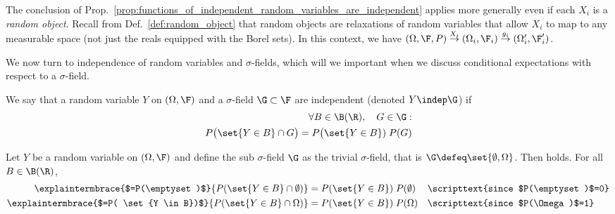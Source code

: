 \documentclass{article} %
\begin{document}
\begin{remark}{}
The conclusion of Prop.~\ref{prop:functions_of_independent_random_variables_are_independent} applies more generally even if each $X_i$ is a  \textit{random object}.  Recall from Def.~\ref{def:random_object} that random objects are relaxations of random variables that allow $X_i$ to map to any measurable space (not just the reals equipped with the Borel sets).  In this context, we have $(\Omega, \F, P) \stackrel{X_i}{\to} (\Omega_i, \F_i) \stackrel{g_i}{\to} (\Omega_i', \F_i')$.
\end{remark}

We now turn to independence of random variables and $\sigma$-fields, which will we important when we discuss conditional expectations with respect to a $\sigma$-field.

\begin{definition}
We say that a random variable $Y$ on $(\Omega, \F)$ and a $\sigma$-field $\G \subset \F$ are independent (denoted $Y \indep \G$) if 
\begin{align}
\forall B \in \B(\R), \quad G \in \G: & \\
P\big(\set{Y \in B} \cap G \big) = P\big(\set{Y \in B}) \; P(G)
\label{eqn:criterion_for_independence_of_rrandom_variable_and_sigma_field}
\end{align}
\label{def:independence_of_random_variable_and_sigma_field}
\end{definition}

\begin{example}	
Let $Y$ be a random variable on $(\Omega, \F)$ and define the sub $\sigma$-field  $\G$ as the trivial $\sigma$-field, that is $\G \defeq \set{\emptyset, \Omega}$.  Then  holds.  For all $B \in \B(\R)$,
%
\begin{align*}
\explaintermbrace{$=P(\emptyset)$}{P( \set{Y \in B} \cap \emptyset)} &= P( \set{Y \in B}) \; P(\emptyset) && \scripttext{since $P(\emptyset)$=0} \\
\explaintermbrace{$=P( \set{Y \in B})$}{P( \set{Y \in B} \cap \Omega)} &= P( \set{Y \in B}) \; P(\Omega) && \scripttext{since $P(\Omega)$=1} \\
\end{align*}
\label{ex:any_random_variable_is_independent_of_the_trivial_sigma_field}
\end{example}
\end{document}
